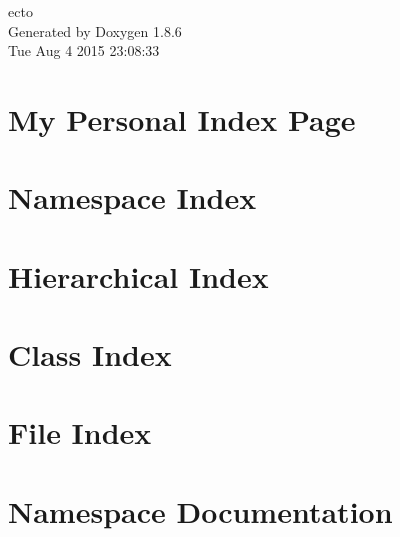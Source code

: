 \documentclass[twoside]{book}
\newcommand{\clearemptydoublepage}{%
  \newpage{\pagestyle{empty}\cleardoublepage}%
}
\begin{document}
\hypersetup{pageanchor=false}
\begin{titlepage}
\vspace*{7cm}
\begin{center}%
{\Large ecto }\\
\vspace*{1cm}
{\large Generated by Doxygen 1.8.6}\\
\vspace*{0.5cm}
{\small Tue Aug 4 2015 23:08:33}\\
\end{center}
\end{titlepage}
\clearemptydoublepage
\tableofcontents
\clearemptydoublepage
{}
\hypersetup{pageanchor=true}

\chapter{My Personal Index Page}
\label{index}\hypertarget{index}{}
\chapter{Namespace Index}

\chapter{Hierarchical Index}

\chapter{Class Index}

\chapter{File Index}

\chapter{Namespace Documentation}

















\end{document}
